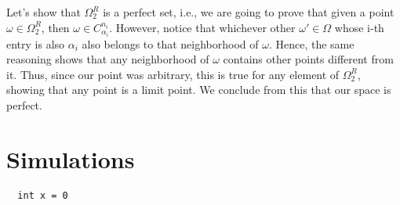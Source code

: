 \documentclass{article}
\begin{document}
Let's show that $\Omega _{2} ^{R}$ is a perfect set, i.e., we are going to prove that given a point $\omega\in\Omega _{2}^{R}$,
then $\omega\in{C _{\alpha_i}^{n_i}}.$ However, notice that whichever other $\omega'\in\Omega$ whose i-th entry is also
$\alpha_i$ also belongs to that neighborhood of $\omega$. Hence, the same reasoning shows that any neighborhood of
$\omega$ contains other points different from it. Thus, since our point was arbitrary, this is true for any element
of $\Omega _{2}^{R}$, showing that any point is a limit point. We conclude from this that our space is perfect.
\newpage

\section{Simulations}
\begin{verbatim}
  int x = 0
  
\end{verbatim}
\end{document}
